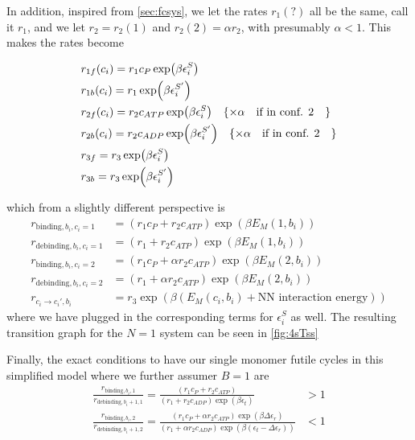 \documentclass[11pt]{article}
\begin{document}
In addition, inspired from \cref{sec:fcsys}, we let the rates $r_1(?)$ all be the same, call it $r_1$, and we let $r_2=r_2(1)$ and $r_2(2)=\alpha r_2$, with presumably $\alpha < 1$.
This makes the rates become
\begin{tcolorbox}
    \begin{align}
        &r_{1f}(c_i) = r_1c_P\exp(\beta\epsilon_i^S) \label{eq:rate1f} \\
        &r_{1b}(c_i) = r_1\exp(\beta\epsilon_i^{S'}) \label{eq:rate1b} \\
        &r_{2f}(c_i) = r_2c_{ATP}\exp(\beta\epsilon_i^S) \quad \{\times \alpha \qq{if in conf. 2}\} \label{eq:rate2f} \\
        &r_{2b}(c_i) = r_2c_{ADP}\exp(\beta\epsilon_i^{S'}) \quad \{\times \alpha \qq{if in conf. 2}\} \label{eq:rate2b} \\
        &r_{3f} = r_3\exp(\beta\epsilon_i^S) \label{eq:rate3f} \\
        &r_{3b} = r_3\exp(\beta\epsilon_i^{S'}) \label{eq:rate3b}
    \end{align}
\end{tcolorbox}
which from a slightly different perspective is
\begin{align}
    r_{\text{binding},b_i,c_i=1} &= (r_1c_P+r_2c_{ATP})\exp(\beta E_M(1, b_i)) \\
    r_{\text{debinding},b_i,c_i=1} &= (r_1+r_2c_{ATP})\exp(\beta E_M(1, b_i)) \\
    r_{\text{binding},b_i,c_i=2} &= (r_1c_P+\alpha r_2c_{ATP})\exp(\beta E_M(2, b_i)) \\
    r_{\text{debinding},b_i,c_i=2} &= (r_1+\alpha r_2c_{ATP})\exp(\beta E_M(2, b_i)) \\
    r_{c_i \rightarrow c_i',b_i} &= r_3\exp(\beta (E_M(c_i, b_i) + \text{NN interaction energy}))
\end{align}
where we have plugged in the corresponding terms for $\epsilon_i^S$ as well.
The resulting transition graph for the $N=1$ system can be seen in \cref{fig:4sTss}

Finally, the exact conditions to have our single monomer futile cycles in this simplified model where we further assumer $B=1$ are
\begin{align}
    \frac{r_{\text{binding},b_i,1}}{r_{\text{debinding},b_i+1,1}} = \frac{(r_1c_P+r_2c_{ATP})}{(r_1+r_2c_{ADP})\exp(\beta \epsilon_t)} &> 1 \\
    \frac{r_{\text{binding},b_i,2}}{r_{\text{debinding},b_i+1,2}} = \frac{(r_1c_P+\alpha r_2c_{ATP})\exp(\beta \Delta\epsilon_r)}{(r_1+\alpha r_2c_{ADP})\exp(\beta (\epsilon_t-\Delta\epsilon_r))} &< 1 \\
\end{align}
\end{document}
